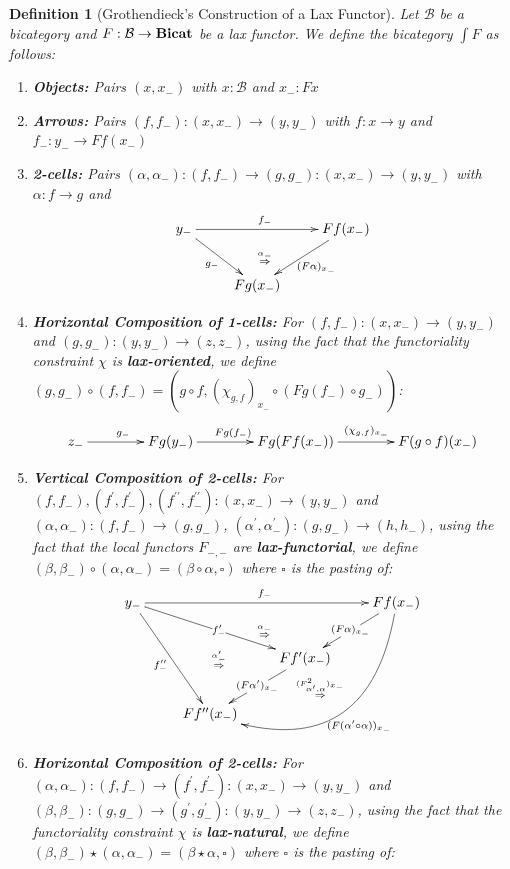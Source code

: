 \documentclass{article}
\numberwithin{equation}{section}
\theoremstyle{definition}
\theoremstyle{plain}
\newtheorem{definition}[equation]{Definition}
\newcommand{\Bicat}{\textnormal{\textbf{Bicat}}}
\begin{document}
\begin{definition}[Grothendieck's Construction of a Lax Functor] Let $\mathcal{B}$ be a bicategory and $F:\mathcal{B} \to \Bicat$ be a lax functor. We define the bicategory $\int F$ as follows:
	\begin{enumerate}[label = $\bullet$]
		\item \textbf{Objects:} Pairs $(x, x_-)$ with $x:\mathcal{B}$ and $x_-: Fx$
		\item \textbf{Arrows:} Pairs $(f,f_-):(x, x_-) \to (y, y_-)$ with $f: x \to y$ and $f_-:y_- \to Ff(x_-)$
		\item \textbf{2-cells:} Pairs $(\alpha, \alpha_-):(f,f_-) \to (g,g_-):(x, x_-) \to (y, y_-)$ with $\alpha: f \to g$ and
		\[\xymatrix{
			y_- \ar[dr]_{g_-} \ar[rr]^{f_-} \ar@{}[drr]|{\overset{\alpha_-}{\Rightarrow}} && Ff(x_-) \ar[dl]^{(F\alpha)_{x_-}}\\
			& Fg(x_-)&
		}\]
		\item \textbf{Horizontal Composition of 1-cells:} For $(f,f_-):(x, x_-) \to (y, y_-)$ and $(g,g_-):(y, y_-) \to (z, z_-)$, using the fact that the functoriality constraint $\chi$ is \textbf{lax-oriented}, we define $(g,g_-)\circ (f,f_-) = (g\circ f, (\chi_{g,f})_{x_-} \circ (Fg(f_-) \circ g_-))$:
		\[\xymatrix@C=4em{
			z_- \ar[r]^{g_-} & Fg(y_-) \ar[r]^{Fg(f_-)} & Fg(Ff(x_-)) \ar[r]^{(\chi_{g,f})_{x_-}} & F(g\circ f)(x_-)
		}\]
		\item \textbf{Vertical Composition of 2-cells:} For $(f,f_-), (f^{\prime},f_-^{\prime}), (f^{\prime\prime},f_-^{\prime\prime}):(x, x_-) \to (y, y_-)$ and $(\alpha, \alpha_-): (f,f_-) \to (g,g_-)$, $(\alpha^{\prime}, \alpha^{\prime}_-): (g,g_-) \to (h,h_-)$, using the fact that the local functors $F_{-,-}$ are \textbf{lax-functorial}, we define $(\beta, \beta_-) \circ (\alpha, \alpha_-) = (\beta \circ \alpha, \square)$ where $\square$ is the pasting of:
		\[\xymatrix{
			y_- \ar[rrr]^{f_-} \ar@{}[drrr]|{\overset{\alpha_-}{\Rightarrow}} \ar[drr]|{f_-^{\prime}} \ar@{}[ddrr]|{\overset{\alpha_-^{\prime}}{\Rightarrow}} \ar[ddr]_{f_-^{\prime\prime}} &&& Ff(x_-) \ar[dl]|{(F\alpha)_{x_-}} \ar@/^4pc/[ddll]^{(F(\alpha^{\prime} \circ\alpha))_{x_-}} \ar@/^2pc/@{{}{ }{}}[ddll]|{\overset{(F_{\alpha^{\prime},\alpha}^2)_{x_-}}{\Rightarrow}}\\
			&& Ff^{\prime}(x_-) \ar[dl]|{(F\alpha^{\prime})_{x_-}} &\\
			& Ff^{\prime\prime}(x_-) &
		}\]
		\item \textbf{Horizontal Composition of 2-cells:} For $(\alpha, \alpha_-): (f,f_-) \to (f^{\prime},f^{\prime}_-):(x, x_-) \to (y, y_-)$ and $(\beta, \beta_-): (g,g_-) \to (g^{\prime},g^{\prime}_-):(y, y_-) \to (z, z_-)$, using the fact that the functoriality constraint $\chi$ is \textbf{lax-natural}, we define $(\beta, \beta_-) \star (\alpha, \alpha_-) = (\beta \star \alpha, \square)$ where $\square$ is the pasting of:

\end{enumerate}
\end{definition}
\end{document}

